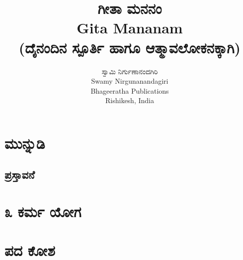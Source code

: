 \documentclass[12pt,twoside,openright,a5paper]{book}
\title{\Huge \kanfont \textbf{ಗೀತಾ ಮನನಂ}\\
{\normalsize Gita Mananam\\}
{\small(ದೈನಂದಿನ ಸ್ಪೂರ್ತಿ ಹಾಗೂ ಆತ್ಮಾವಲೋಕನಕ್ಕಾಗಿ)}}
\author{\large \kanfont ಸ್ವಾಮಿ ನಿರ್ಗುಣಾನಂದಗಿರಿ\\
{\normalsize Swamy Nirgunanandagiri}\\
\vspace{15mm}
{\normalsize Bhageeratha Publications}\\
{Rishikesh, India}
}
\date{} %
\begin{document}




\thispagestyle{empty}
\frontmatter

\doublespacing
\tableofcontents
\singlespacing

\thispagestyle{empty}
\thispagestyle{empty}
\pagestyle{fancy}


\chapter{\kanfont ಮುನ್ನುಡಿ}

\begin{onehalfspace}
\chapter{\kanfont ಪ್ರಸ್ತಾವನೆ}

\end{onehalfspace}
\mainmatter
%
\chapter{\kanfont ೩ ಕರ್ಮ ಯೋಗ}
%
\makeatletter\@openrightfalse


\chapter{\kanfont ಪದ ಕೋಶ}

\printindex

\end{document}

